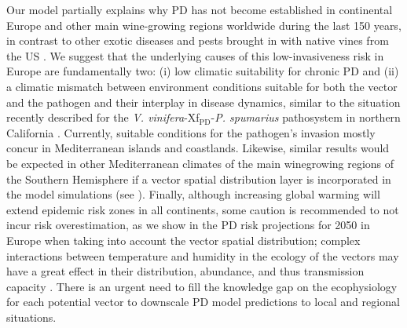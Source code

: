     Our model partially explains why PD has not become established in
    continental
    Europe and other main wine-growing regions worldwide during the last 150
    years,
    in contrast to other exotic diseases and pests brought in with native vines
    from the US \cite{Borkarbook, Brewer2010, Rouxel2014, Tello2019}. We
    suggest
    that the underlying causes of this low-invasiveness risk in Europe are
    fundamentally two: (i) low climatic suitability for chronic PD and (ii) a
    climatic mismatch between environment conditions suitable for both the
    vector
    and the pathogen and their interplay in disease dynamics, similar to the
    situation recently described for the \textit{V.
        vinifera}-Xf$_{\textrm{PD}}$-{\textit{P. spumarius}} pathosystem in
northern
California \cite{Beal2021}. Currently, suitable conditions for the
pathogen's
invasion mostly concur in Mediterranean islands and coastlands. Likewise,
similar results would be expected in other Mediterranean
climates of the main winegrowing regions of the Southern Hemisphere if a
vector
spatial distribution layer is incorporated in the model simulations (see
\cite{Webpage}). Finally, although increasing global warming will extend
epidemic risk zones in all continents, some caution is recommended to not
incur
risk overestimation, as we show in the PD risk projections for 2050 in
Europe
when taking into account the vector spatial distribution; complex
interactions
between temperature and humidity in the ecology of the vectors may have a
great
effect in their distribution, abundance, and thus transmission capacity
\cite{Godefroid2021}. There is an urgent need to fill the knowledge gap on
the
ecophysiology for each potential vector to downscale PD model predictions
to
local and regional situations.